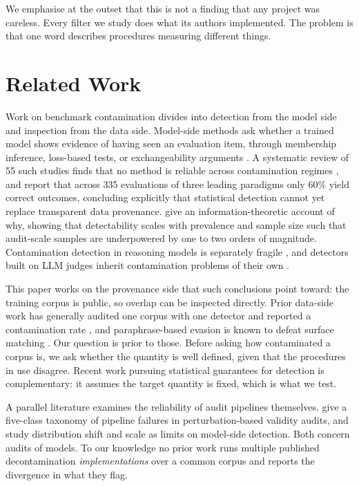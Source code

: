 \documentclass[11pt]{article}
\begin{document}
We emphasise at the outset that this is not a finding that any project was
careless. Every filter we study does what its authors implemented. The problem is
that one word describes procedures measuring different things.

\section{Related Work}

Work on benchmark contamination divides into detection from the model side and
inspection from the data side. Model-side methods ask whether a trained model
shows evidence of having seen an evaluation item, through membership inference,
loss-based tests, or exchangeability arguments \citep{oren2024}. A systematic
review of 55 such studies finds that no method is reliable across contamination
regimes \citep{gemreview}, and \citet{reliabilitygap} report that across 335
evaluations of three leading paradigms only 60\% yield correct outcomes,
concluding explicitly that statistical detection cannot yet replace transparent
data provenance. \citet{detectable} give an information-theoretic account of why,
showing that detectability scales with prevalence and sample size such that
audit-scale samples are underpowered by one to two orders of magnitude.
Contamination detection in reasoning models is separately fragile
\citep{fragility}, and detectors built on LLM judges inherit contamination
problems of their own \citep{preferenceleakage, judgerobustness}.

This paper works on the provenance side that such conclusions point toward: the
training corpus is public, so overlap can be inspected directly. Prior data-side
work has generally audited one corpus with one detector and reported a
contamination rate \citep{sainz2023}, and paraphrase-based evasion is known to
defeat surface matching \citep{yang2023rephrase}. Our question is prior to those.
Before asking how contaminated a corpus is, we ask whether the quantity is well
defined, given that the procedures in use disagree. Recent work pursuing
statistical guarantees for detection \citep{controllable} is complementary: it
assumes the target quantity is fixed, which is what we test.

A parallel literature examines the reliability of audit pipelines themselves.
\citet{auditingtheaudit} give a five-class taxonomy of pipeline failures in
perturbation-based validity audits, and \citet{reliabilitygap} study distribution
shift and scale as limits on model-side detection. Both concern audits of models.
To our knowledge no prior work runs multiple published decontamination
\emph{implementations} over a common corpus and reports the divergence in what
they flag.
\end{document}
